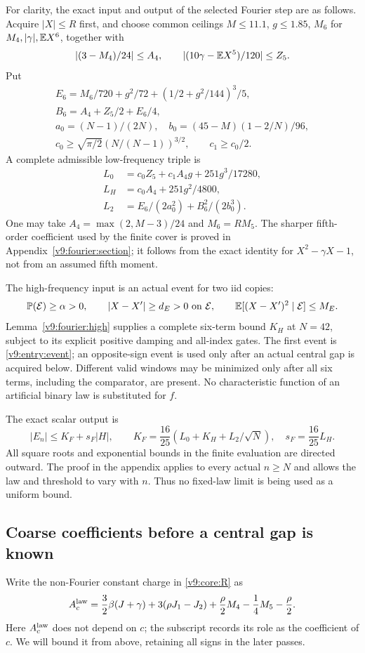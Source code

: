 For clarity, the exact input and output of the selected Fourier step
are as follows. Acquire $|X|\le R$ first, and choose common ceilings
$M\le11.1$, $g\le1.85$, $M_6$ for
$M_4,|\gamma|,\mathbb E X^6$, together with
\[
 |(3-M_4)/24|\le A_4,\qquad
 |(10\gamma-\mathbb E X^5)/120|\le Z_5.
\]
Put
\begin{gather*}
 E_6=M_6/720+g^2/72+(1/2+g^2/144)^3/5,\\
 B_6=A_4+Z_5/2+E_6/4,\\
 a_0=(N-1)/(2N),\quad b_0=(45-M)(1-2/N)/96,\\
 c_0\ge\sqrt{\pi/2}(N/(N-1))^{3/2},\qquad c_1\ge c_0/2.
\end{gather*}
A complete admissible low-frequency triple is
\begin{align*}
 L_0&=c_0Z_5+c_1A_4g+251g^3/17280,\\
 L_H&=c_0A_4+251g^2/4800,\\
 L_2&=E_6/(2a_0^2)+B_6^2/(2b_0^3).
\end{align*}
One may take $A_4=\max(2,M-3)/24$ and $M_6=R M_5$.
The sharper fifth-order coefficient used by the finite cover is proved
in Appendix~\ref{v9:fourier:section}; it follows from the exact
identity for $X^2-\gamma X-1$, not from an assumed fifth moment.

The high-frequency input is an actual event for two iid copies:
\[
 \mathbb P(\mathcal E)\ge\alpha>0,\qquad
 |X-X'|\ge d_E>0\text{ on }\mathcal E,\qquad
 \mathbb E[(X-X')^2\mid\mathcal E]\le M_E.
\]
Lemma~\ref{v9:fourier:high} supplies a complete six-term bound $K_H$
at $N=42$, subject to its explicit positive damping and all-index gates.
The first event is \eqref{v9:entry:event}; an opposite-sign event is
used only after an actual central gap is acquired below. Different valid
windows may be minimized only after all six terms, including the
comparator, are present. No characteristic function of an artificial
binary law is substituted for $f$.

The exact scalar output is
\begin{equation}\label{v9:entry:fourier-output}
 |E_n|\le K_F+s_F|H|,\qquad
 K_F=\frac{16}{25}(L_0+K_H+L_2/\sqrt N),\quad
 s_F=\frac{16}{25}L_H.
\end{equation}
All square roots and exponential bounds in the finite evaluation are
directed outward. The proof in the appendix applies to every actual
$n\ge N$ and allows the law and threshold to vary with $n$.
Thus no fixed-law limit is being used as a uniform bound.

\subsection{Coarse coefficients before a central gap is known}
\label{v9:entry:coarse-coefficients}
Write the non-Fourier constant charge in \eqref{v9:core:R} as
\[
 A_c^{\rm law}=\frac32\beta(J+\gamma)+3(\rho J_1-J_2)
                   +\frac\rho2M_4-\frac14M_5-\frac\rho2.
\]
Here $A_c^{\rm law}$ does not depend on $c$; the subscript records its
role as the coefficient of $c$. We will bound it from above, retaining
all signs in the later passes.

